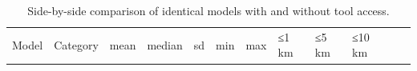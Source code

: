 \documentclass[
  10pt,
  twocolumn]{article}
\begin{document}
\begin{longtable}[]{@{}
  >{\raggedright\arraybackslash}p{}
  >{\raggedright\arraybackslash}p{}
  >{\raggedright\arraybackslash}p{}
  >{\raggedright\arraybackslash}p{}
  >{\raggedright\arraybackslash}p{}
  >{\raggedright\arraybackslash}p{}
  >{\raggedright\arraybackslash}p{}
  >{\raggedright\arraybackslash}p{}
  >{\raggedright\arraybackslash}p{}
  >{\raggedright\arraybackslash}p{}
  >{\raggedright\arraybackslash}p{}
  >{\raggedright\arraybackslash}p{}@{}}
\caption{\label{tbl:tool_direct_comparison}Side-by-side comparison of
identical models with and without tool access.}\tabularnewline
\toprule\noalign{}
\begin{minipage}[b]{\linewidth}\raggedright
Model
\end{minipage} & \begin{minipage}[b]{\linewidth}\raggedright
Category
\end{minipage} & \begin{minipage}[b]{\linewidth}\raggedright
mean
\end{minipage} & \begin{minipage}[b]{\linewidth}\raggedright
median
\end{minipage} & \begin{minipage}[b]{\linewidth}\raggedright
sd
\end{minipage} & \begin{minipage}[b]{\linewidth}\raggedright
min
\end{minipage} & \begin{minipage}[b]{\linewidth}\raggedright
max
\end{minipage} & \begin{minipage}[b]{\linewidth}\raggedright
≤1 km
\end{minipage} & \begin{minipage}[b]{\linewidth}\raggedright
≤5 km
\end{minipage} & \begin{minipage}[b]{\linewidth}\raggedright
≤10 km
\end{minipage} & \begin{minipage}[b]{\linewidth}\raggedright

\end{minipage}
\end{longtable}
\end{document}
